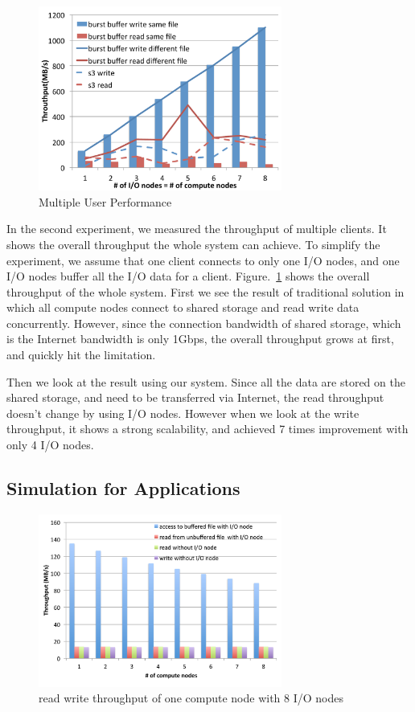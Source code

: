 \begin{figure}
\centering
\includegraphics[width=8cm]{img/multiple_client.pdf}
\caption{Multiple User Performance}
\label{evaluation:multiple user performance}
\end{figure}

In the second experiment, we measured the throughput of multiple clients.
It shows the overall throughput the whole system can achieve.
To simplify the experiment, we assume that one client connects to only one I/O nodes, and one I/O
nodes buffer all the I/O data for a client.
Figure.~\ref{evaluation:multiple user performance} shows the overall throughput of the whole system.
First we see the result of traditional solution in which all compute nodes connect to shared storage
and read write data concurrently.
However, since the connection bandwidth of shared storage, which is the Internet bandwidth is only
1Gbps, the overall throughput grows at first, and quickly hit the limitation.

Then we look at the result using our system.
Since all the data are stored on the shared storage, and need to
be transferred via Internet, the read throughput doesn't change by using I/O nodes.
However when we look at the write throughput, it shows a strong scalability, and achieved 7 times
improvement with only 4 I/O nodes.

\subsection{Simulation for Applications}

\begin{figure}
\centering
\includegraphics[width=8cm]{img/simulation_throughput}
\caption{read write throughput of one compute node with 8 I/O nodes}
\label{evaluation:simulation throughput}
\end{figure}

